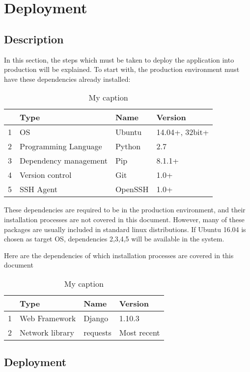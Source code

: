 \section{Deployment}
\subsection{Description}
In this section, the steps which must be taken to deploy the application
into production will be explained. To start with, the production environment
must have these dependencies already installed:

\begin{table}[H]
\centering
\caption{My caption}
\label{my-label}
\begin{tabular}{@{}llll@{}}
\toprule
 & Type & Name & Version \\ 
\midrule
1 & OS     & Ubuntu     & 14.04+, 32bit+        \\
2 & Programming Language     & Python    & 2.7       \\
3 & Dependency management & Pip & 8.1.1+ \\
4 & Version control & Git & 1.0+ \\
5 & SSH Agent & OpenSSH & 1.0+ \\
\bottomrule
\end{tabular}
\end{table}


These dependencies are required to be in the production environment,
and their installation processes are not covered in this document. However,
many of these packages are usually included in standard linux distributions.
If Ubuntu 16.04 is chosen as target OS, dependencies 2,3,4,5 will be 
available in the system.

Here are the dependencies of which installation processes are covered in this
document

\begin{table}[H]
\centering
\caption{My caption}
\label{my-label}
\begin{tabular}{@{}llll@{}}
\toprule
 & Type & Name & Version \\ 
\midrule
1 & Web Framework & Django & 1.10.3 \\
2 & Network library & requests & Most recent \\
\bottomrule
\end{tabular}
\end{table}


\subsection{Deployment}

